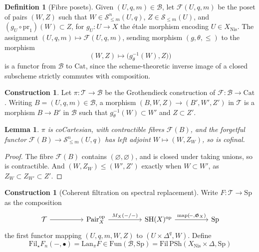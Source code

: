 \documentclass[11pt, twoside]{article}
\numberwithin{equation}{section}
\newtheorem{lemma}[equation]{Lemma}
\theoremstyle{definition}
\newtheorem{definition}[equation]{Definition}
\newtheorem{construction}[equation]{Construction}
\newcommand{\pr}{\mathrm{pr}}
\newcommand{\map}{\mathrm{map}}
\newcommand{\fil}{\mathrm{Fil}}
\newcommand{\sh}{\mathrm{SH}}
\newcommand{\Sp}{\mathrm{Sp}}
\newcommand{\psh}{\mathrm{PSh}}
\newcommand{\lan}{\mathrm{Lan}}
\newcommand{\fun}{\mathrm{Fun}}
\newcommand{\nis}{\mathrm{Nis}}
\newcommand{\op}{\mathrm{op}}
\begin{document}
\begin{definition}[Fibre posets]\label{def:fib-poset}
Given \((U, q, m) \in \mathcal{B}\), let \(\mathcal{F}(U, q, m)\) be the poset of pairs \((W, Z)\) such that \(W \in \mathcal{S}_{\leq m}^n(U, q)\), \(Z \in \mathcal{S}_{\leq m}(U)\), and \((g_U \circ \pr_1)(W) \subset Z\), for \(g_U \colon U \to X\) the étale morphism encoding \(U \in X_\nis\). The assignment \((U, q, m) \mapsto \mathcal{F}(U, q, m)\), sending morphism \((g, \theta, \leq)\) to the morphism 
\[(W, Z) \mapsto \big(g_\theta^{- 1}(W), Z)\big)\]
is a functor from \(\mathcal{B}\) to \(\mathrm{Cat}\), since the scheme-theoretic inverse image of a closed subscheme strictly commutes with composition.
\end{definition}

\begin{construction}
Let \(\pi \colon \mathcal{T} \to \mathcal{B}\) be the Grothendieck construction of \(\mathcal{F} \colon \mathcal{B} \to \mathrm{Cat}\).
Writing \(B = (U, q, m) \in \mathcal{B}\), a morphism \((B, W, Z) \to (B', W', Z')\) in \(\mathcal{T}\) is a morphism \(B \to B'\) in \(\mathcal{B}\) such that \(g_\theta^{- 1}(W) \subset W'\) and \(Z \subset Z'\).
\end{construction}

\begin{lemma}\label{lemm:colim-prep}
\(\pi\) is coCartesian, with contractible fibres \(\mathcal{F}(B)\), and the forgetful functor \(\mathcal{F}(B) \to \mathcal{S}_{\leq m}^n(U, q)\) has left adjoint \(W \mapsto (W, Z_W)\), so is cofinal.
\end{lemma}

\begin{proof}
The fibre \(\mathcal{F}(B)\) contains \((\varnothing, \varnothing)\), and is closed under taking unions, so is contractible. And \((W, Z_W) \leq (W', Z')\) exactly when \(W \subset W'\), as \(Z_W \subset Z_{W'} \subset Z'\).
\end{proof}

\begin{construction}[Coherent filtration on spectral replacement]
Write \(F \colon \mathcal{T} \to \Sp\) as the composition 
\[\begin{tikzcd} [column sep = huge]
\mathcal{T} \ar[r] & \mathrm{Pair}_X^\op \ar[r, "{M_X(-/-)}"] & \sh(X)^\op \ar[r, "{\map(\!-,\mathfrak{G}_X)}"] & \Sp
\end{tikzcd}\]
the first functor mapping \((U, q, m, W, Z)\) to \((U \times \Delta^q, W)\). Define 
\[\fil_\star F_n( -, \bullet) = \lan_\pi F \in \fun(\mathcal{B}, \Sp) = \fil \, \psh(X_\nis \times \Delta, \Sp)\]
\end{construction}
\end{document}
